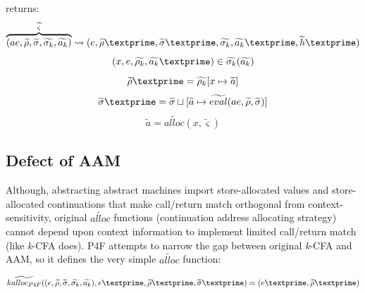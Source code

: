 \documentclass{article}
\begin{document}
returns:
\[
\overbrace{
(ae, \widetilde{\rho}, \widetilde{\sigma}, \widetilde{\sigma_k}, \widetilde{a_k})
}^{\widetilde{\varsigma}}
\leadsto (e, \widetilde{\rho}\textprime, \widetilde{\sigma}\textprime, \widetilde{\sigma_k}, \widetilde{a_k}\textprime, \widetilde{h}\textprime)
\]
\[
(x, e, \widetilde{\rho_k}, \widetilde{a_k}\textprime) \in \widetilde{\sigma_k}(\widetilde{a_k})
\]
\[
\widetilde{\rho}\textprime = \widetilde{\rho_k}[x \mapsto \widetilde{a}]
\]
\[
\widetilde{\sigma}\textprime = \widetilde{\sigma} \sqcup [\widetilde{a} \mapsto \widetilde{eval}(ae, \widetilde{\rho}, \widetilde{\sigma})]
\]
\[
\widetilde{a} = \widetilde{alloc}(x, \widetilde{\varsigma})
\]

\subsection{Defect of AAM}
\label{sub:Defect of AAM}
Although, abstracting abstract machines import store-allocated values and store-allocated continuations that make call/return match orthogonal from context-sensitivity, original $\widetilde{alloc}$ functions (continuation address allocating strategy) cannot depend upon context information to implement limited call/return match (like \textit{k}-CFA does). P4F attempts to narrow the gap between original \textit{k}-CFA and AAM, so it defines the very simple $\widetilde{alloc}$ function:

\[
\widetilde{kalloc_{P4F}} ((e, \widetilde{\rho}, \widetilde{\sigma}, \widetilde{\sigma_k}, \widetilde{a_k}), e\textprime, \widetilde{\rho}\textprime, \widetilde{\sigma}\textprime) = (e\textprime, \widetilde{\rho}\textprime)
\]
\end{document}
